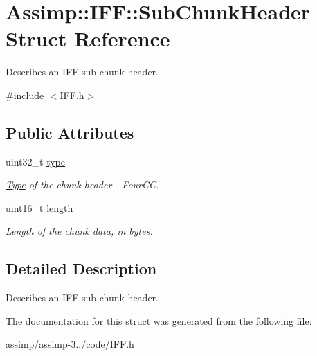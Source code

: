 \hypertarget{struct_assimp_1_1_i_f_f_1_1_sub_chunk_header}{\section{Assimp\+:\+:I\+F\+F\+:\+:Sub\+Chunk\+Header Struct Reference}
\label{struct_assimp_1_1_i_f_f_1_1_sub_chunk_header}
}


Describes an I\+F\+F sub chunk header.  




{\ttfamily \#include $<$I\+F\+F.\+h$>$}

\subsection*{Public Attributes}
\begin{DoxyCompactItemize}
\item 
\hypertarget{struct_assimp_1_1_i_f_f_1_1_sub_chunk_header_a0bae8e5db4d572a6be1c2bfaa6aa1915}{uint32\+\_\+t \hyperlink{struct_assimp_1_1_i_f_f_1_1_sub_chunk_header_a0bae8e5db4d572a6be1c2bfaa6aa1915}{type}}\label{struct_assimp_1_1_i_f_f_1_1_sub_chunk_header_a0bae8e5db4d572a6be1c2bfaa6aa1915}

\begin{DoxyCompactList}\small\item\em \hyperlink{struct_type}{Type} of the chunk header -\/ Four\+C\+C. \end{DoxyCompactList}\item 
\hypertarget{struct_assimp_1_1_i_f_f_1_1_sub_chunk_header_a9bd7cd5435ae9a6b490ec98e26e0c8c4}{uint16\+\_\+t \hyperlink{struct_assimp_1_1_i_f_f_1_1_sub_chunk_header_a9bd7cd5435ae9a6b490ec98e26e0c8c4}{length}}\label{struct_assimp_1_1_i_f_f_1_1_sub_chunk_header_a9bd7cd5435ae9a6b490ec98e26e0c8c4}

\begin{DoxyCompactList}\small\item\em Length of the chunk data, in bytes. \end{DoxyCompactList}\end{DoxyCompactItemize}


\subsection{Detailed Description}
Describes an I\+F\+F sub chunk header. 

The documentation for this struct was generated from the following file\+:\begin{DoxyCompactItemize}
\item 
assimp/assimp-\/3../code/I\+F\+F.\+h\end{DoxyCompactItemize}
